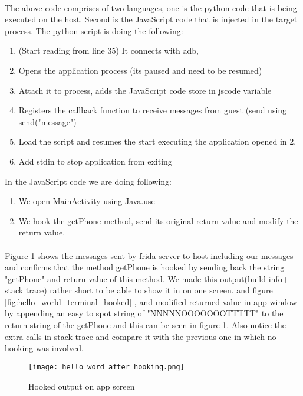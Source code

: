 \documentclass[../main.tex]{subfile}
\begin{document}
	\paragraph{} The above code comprises of two languages, one is the python code that is being executed on the host. Second is the JavaScript code that is injected in the target process. The python script is doing the following:
	\begin{enumerate}
		\item (Start reading from line 35) It connects with adb,
		\item Opens the application process (its paused and need to be resumed)
		\item Attach it to process, adds the JavaScript code store in jscode variable
		\item Registers the callback function to receive messages from guest (send using send("message")
		\item Load the script and resumes the start executing the application opened in 2.
		\item Add stdin to stop application from exiting
	\end{enumerate}	
	In the JavaScript code we are doing following:
	\begin{enumerate}
		\item We open MainActivity using Java.use
		\item We hook the getPhone method, send its original return value and modify the return value.
	\end{enumerate}
	\paragraph{} Figure \ref{fig:hello_world_app_hooked} shows the messages sent by frida-server to host including our messages and confirms that the method getPhone is hooked by sending back the string "getPhone" and return value of this method. We made this output(build info+ stack trace) rather short to be able to show it in on one screen. and figure \ref{fig:hello_world_terminal_hooked} , and modified returned value in app window by appending an easy to spot string of "NNNNNOOOOOOOTTTTT" to the return string of the getPhone and this can be seen in figure \ref{fig:hello_world_app_hooked}. Also notice the extra calls in stack trace and compare it with the previous one in which no hooking was involved.
	
\begin{figure}
	\texttt{[image: hello\_word\_after\_hooking.png]}
	\caption{Hooked output on app screen}
	\label{fig:hello_world_app_hooked}
\end{figure}
\end{document}
